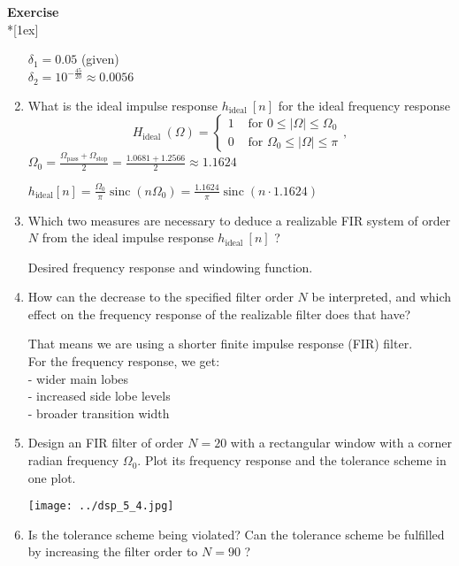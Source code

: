 \documentclass[12pt,a4paper,austrian]{article}
\newcounter{theaufgabe}\setcounter{theaufgabe}{1}
\newenvironment{aufgabe}[1]%
  {\bigskip\par\noindent\begin{nopagebreak}
   \textsf{\textbf{Exercise \arabic{theaufgabe}}}\quad
      \textsf{\textit{#1}}\\*[1ex]%
\stepcounter{theaufgabe}\hspace{2ex}\end{nopagebreak}}
  {\par\pagebreak[2]}
\begin{document}
\begin{aufgabe}{}
\begin{enumerate}
    $\delta_1 = 0.05$ (given) \\
    $\delta_2 = 10^{-\frac{45}{20}} \approx 0.0056$
  \item What is the ideal impulse response $h_{\text {ideal }}[n]$ for the ideal frequency response
          $$
          H_{\text {ideal }}(\Omega)=\left\{\begin{array}{ll}
          1 & \text { for } 0 \leq|\Omega| \leq \Omega_0 \\
          0 & \text { for } \Omega_0 \leq|\Omega| \leq \pi
          \end{array},\right.
          $$
    $\Omega_0 = \frac{\Omega_{\text{pass}} + \Omega_{\text{stop}}}{2} = \frac{1.0681 + 1.2566}{2} \approx 1.1624$

    $h_{\text{ideal}}[n] = \frac{\Omega_0}{\pi} \operatorname{sinc}(n \Omega_0) = \frac{1.1624}{\pi} \operatorname{sinc}(n \cdot 1.1624)$

  \item Which two measures are necessary to deduce a realizable FIR system of order $N$ from the ideal impulse response $h_{\text {ideal }}[n]$ ?
          
    \smallskip
    Desired frequency response and windowing function.
  
  \item How can the decrease to the specified filter order $N$ be interpreted, and which effect on the frequency response of the realizable filter does that have?
  
  That means we are using a shorter finite impulse response (FIR) filter. \\
    For the frequency response, we get: \\
    - wider main lobes \\
    - increased side lobe levels \\
    - broader transition width \\

  \pagebreak
  \item Design an FIR filter of order $N=20$ with a rectangular window with a corner radian frequency $\Omega_0$. Plot its frequency response and the tolerance scheme in one plot.

  \begin{center}
    \texttt{[image: ../dsp\_5\_4.jpg]}
  \end{center}

  \item Is the tolerance scheme being violated? Can the tolerance scheme be fulfilled by increasing the filter order to $N=90$ ? \\
  

\end{enumerate}
\end{aufgabe}
\end{document}
